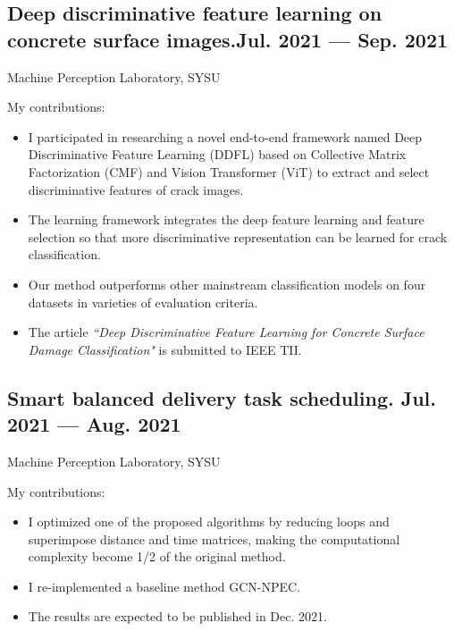 \documentclass[a4,11pt]{article}
\newcommand{\subtext}[1]{
#1\par\vspace{-0.2cm}}
\begin{document}
\subsection*{Deep discriminative feature learning on concrete surface images.\hfill Jul. 2021 --- Sep. 2021} 
\subtext{Machine Perception Laboratory, SYSU } 
\vspace {6pt}
My contributions:
    \begin{itemize}[topsep = 0 pt, itemsep = 0 pt, parsep = 1 pt]
		\item I participated in researching a novel end-to-end framework named Deep Discriminative Feature Learning (DDFL) based on Collective Matrix Factorization (CMF) and Vision Transformer (ViT) to extract and select discriminative features of crack images. 
		\item The learning framework integrates the deep feature learning and feature selection so that more
discriminative representation can be learned for crack classification.
		\item  Our method outperforms other mainstream classification models on four datasets in varieties of evaluation criteria.
		\item The article  \textit{``Deep Discriminative Feature Learning for Concrete Surface Damage Classification"} is submitted to IEEE TII.
    \end{itemize}

\subsection*{Smart balanced delivery task scheduling. \hfill Jul. 2021 --- Aug. 2021} 
\subtext{Machine Perception Laboratory, SYSU } 
\vspace {6pt}
My contributions:
    \begin{itemize}[topsep = 0 pt, itemsep = 0 pt, parsep = 1 pt]
        \item I optimized one of the proposed algorithms by reducing loops and superimpose distance and time matrices, making the computational complexity become 1/2 of the original method. 
		\item I re-implemented a baseline method GCN-NPEC. 
		\item The results are expected to be published in Dec. 2021.
    \end{itemize}





\end{document}
